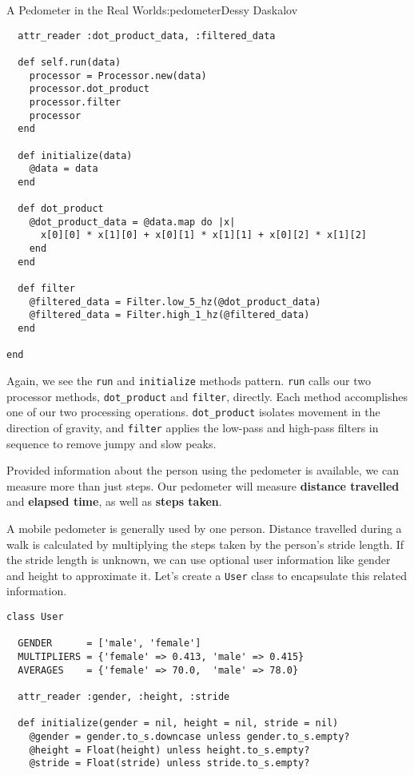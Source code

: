 \begin{aosachapter}{A Pedometer in the Real World}{s:pedometer}{Dessy Daskalov}
\begin{verbatim}
  attr_reader :dot_product_data, :filtered_data

  def self.run(data)
    processor = Processor.new(data)
    processor.dot_product
    processor.filter
    processor
  end

  def initialize(data)
    @data = data
  end

  def dot_product
    @dot_product_data = @data.map do |x|
      x[0][0] * x[1][0] + x[0][1] * x[1][1] + x[0][2] * x[1][2]
    end
  end

  def filter
    @filtered_data = Filter.low_5_hz(@dot_product_data)
    @filtered_data = Filter.high_1_hz(@filtered_data)
  end

end
\end{verbatim}

Again, we see the \texttt{run} and \texttt{initialize} methods pattern.
\texttt{run} calls our two processor methods, \texttt{dot\_product} and
\texttt{filter}, directly. Each method accomplishes one of our two
processing operations. \texttt{dot\_product} isolates movement in the
direction of gravity, and \texttt{filter} applies the low-pass and
high-pass filters in sequence to remove jumpy and slow peaks.

\label{pedometer-functionality}

Provided information about the person using the pedometer is available,
we can measure more than just steps. Our pedometer will measure
\textbf{distance travelled} and \textbf{elapsed time}, as well as
\textbf{steps taken}.

\label{distance-travelled}

A mobile pedometer is generally used by one person. Distance travelled
during a walk is calculated by multiplying the steps taken by the
person's stride length. If the stride length is unknown, we can use
optional user information like gender and height to approximate it.
Let's create a \texttt{User} class to encapsulate this related
information.

\begin{verbatim}
class User

  GENDER      = ['male', 'female']
  MULTIPLIERS = {'female' => 0.413, 'male' => 0.415}
  AVERAGES    = {'female' => 70.0,  'male' => 78.0}

  attr_reader :gender, :height, :stride

  def initialize(gender = nil, height = nil, stride = nil)
    @gender = gender.to_s.downcase unless gender.to_s.empty?
    @height = Float(height) unless height.to_s.empty?
    @stride = Float(stride) unless stride.to_s.empty?


\end{verbatim}
\end{aosachapter}
